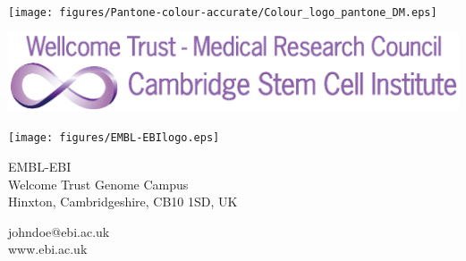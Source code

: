 \documentclass[a0,portrait]{a0poster}
\begin{document}
\begin{minipage}[][][b]{0.20\linewidth}
\texttt{[image: figures/Pantone-colour-accurate/Colour\_logo\_pantone\_DM.eps]}
\end{minipage}
\qquad
\begin{minipage}[][][b]{0.20\linewidth}
\includegraphics[width=15cm]{figures/SCI_logo.eps}
\end{minipage}
\qquad
\begin{minipage}[][][b]{0.20\linewidth}
\texttt{[image: figures/EMBL-EBIlogo.eps]}
\end{minipage}
\qquad
\begin{minipage}[][][b]{0.20\linewidth}
\color{EMBLBlue}
EMBL-EBI \\
Welcome Trust Genome Campus \\
Hinxton, Cambridgeshire, CB10 1SD, UK
\end{minipage}
\qquad
\begin{minipage}[][][b]{0.20\linewidth}
\color{EMBLBlue}
johndoe@ebi.ac.uk \\
www.ebi.ac.uk
\end{minipage}
\end{document}

